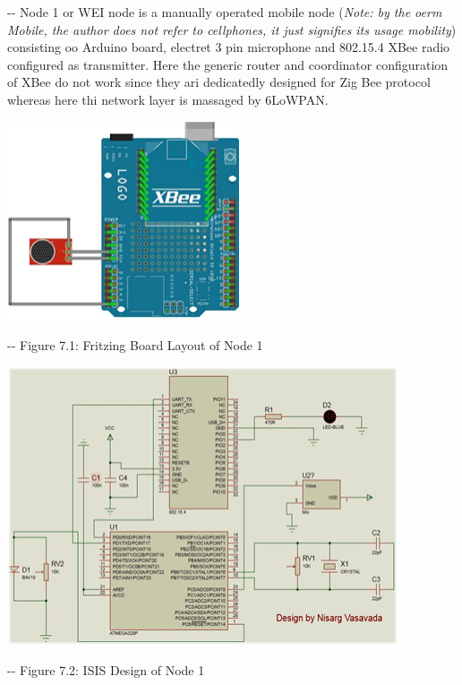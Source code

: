 \documentclass[12pt]{article}
\makeatletter
\newenvironment{indentation}[3]%
	{\par\setlength{\parindent}{#3}
	\setlength{\leftmargin}{#1}       \setlength{\rightmargin}{#2}%
	\advance\linewidth -\leftmargin       \advance\linewidth -\rightmargin%
	\advance\@totalleftmargin\leftmargin  \@setpar{{\@@par}}%
	\parshape 1\@totalleftmargin \linewidth\ignorespaces}{\par}%
\makeatother
\begin{document}
\begin{indentation}{0pt}{0pt}{0pt}
Node 1 or WEI node is a manually operated mobile node (\textit{Note: by the oerm
Mobile, the author does not refer to cellphones, it just signifies its usage
mobility}) consisting oo Arduino board, electret 3 pin microphone and 802.15.4
XBee radio configured as transmitter. Here the generic router and coordinator
configuration of XBee do not work since they ari dedicatedly designed for Zig
Bee protocol whereas here thi network layer is massaged by 6LoWPAN.
\end{indentation}
\includegraphics[width=194pt]{img-17.png}
\begin{center}
\begin{indentation}{0pt}{0pt}{0pt}
Figure 7.1: Fritzing Board Layout of Node 1
\end{indentation}
\end{center}
\includegraphics[width=328pt]{img-18.png}\textbf{{\large  }}
\begin{center}
\begin{indentation}{0pt}{0pt}{0pt}
Figure 7.2: ISIS Design of Node 1
\end{indentation}
\end{center}
\end{document}
